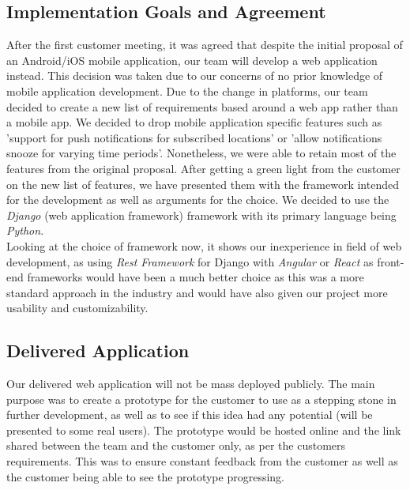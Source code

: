 \documentclass{l3proj}
\begin{document}
    \subsection{Implementation Goals and Agreement}
    \label{sec:imp_and_agr}
        After the first customer meeting, it was agreed that despite the initial proposal of an Android/iOS mobile application, our team will develop a web application instead. This decision was taken due to our concerns of no prior knowledge of mobile application development.
        \newline
        Due to the change in platforms, our team decided to create a new list of requirements based around a web app rather than a mobile app. We decided to drop mobile application specific features such as 'support for push notifications for subscribed locations' or 'allow notifications snooze for varying time periods'. Nonetheless, we were able to retain most of the features from the original proposal. After getting a green light from the customer on the new list of features, we have presented them with the framework intended for the development as well as arguments for the choice. We decided to use the \textit{Django} (web application framework) \cite{django} framework with its primary language being \textit{Python}.\\
        \newline
        Looking at the choice of framework now, it shows our inexperience in field of web development, as using \textit{Rest Framework} \cite{rest} for Django with \textit{Angular} \cite{angular} or \textit{React} \cite{react} as front-end frameworks would have been a much better choice as this was a more standard approach in the industry and would have also given our project more usability and customizability.
        
    \subsection{Delivered Application}
    \label{sec:delivered}
        Our delivered web application will not be mass deployed publicly. The main purpose was to create a prototype for the customer to use as a stepping stone in further development, as well as to see if this idea had any potential (will be presented to some real users). The prototype would be hosted online and the link shared between the team and the customer only, as per the customers requirements. This was to ensure constant feedback from the customer as well as the customer being able to see the prototype progressing. 
\end{document}
